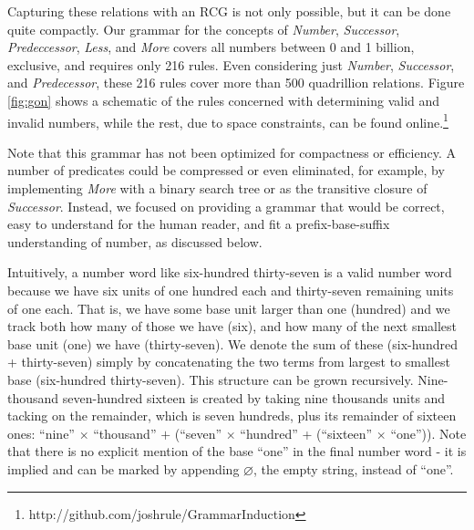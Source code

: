 \documentclass[10pt,letterpaper]{article}
\begin{document}
Capturing these relations with an RCG is not only possible, but it can
be done quite compactly. Our grammar for the concepts of
\emph{Number}, \emph{Successor}, \emph{Predeccessor}, \emph{Less}, and
\emph{More} covers all numbers between 0 and 1 billion, exclusive, and
requires only 216 rules. Even considering just \emph{Number},
\emph{Successor}, and \emph{Predecessor}, these 216 rules cover more
than 500 quadrillion relations. Figure \ref{fig:gon} shows a schematic
of the rules concerned with determining valid and invalid numbers,
while the rest, due to space constraints, can be found
online.\footnote{http://github.com/joshrule/GrammarInduction}

Note that this grammar has not been optimized for compactness or
efficiency. A number of predicates could be compressed or even
eliminated, for example, by implementing \emph{More} with a binary
search tree or as the transitive closure of \emph{Successor}. Instead,
we focused on providing a grammar that would be correct, easy to
understand for the human reader, and fit a prefix-base-suffix
understanding of number, as discussed below.

Intuitively, a number word like six-hundred thirty-seven is a valid
number word because we have six units of one hundred each and
thirty-seven remaining units of one each. That is, we have some base
unit larger than one (hundred) and we track both how many of those we
have (six), and how many of the next smallest base unit (one) we have
(thirty-seven). We denote the sum of these (six-hundred +
thirty-seven) simply by concatenating the two terms from largest to
smallest base (six-hundred thirty-seven). This structure can be grown
recursively. Nine-thousand seven-hundred sixteen is created by taking
nine thousands units and tacking on the remainder, which is seven
hundreds, plus its remainder of sixteen ones: ``nine'' $\times$
``thousand'' $+$ (``seven'' $\times$ ``hundred'' + (``sixteen''
$\times$ ``one'')). Note that there is no explicit mention of the base
``one'' in the final number word - it is implied and can be marked by
appending $\varnothing$, the empty string, instead of ``one''.
\end{document}
